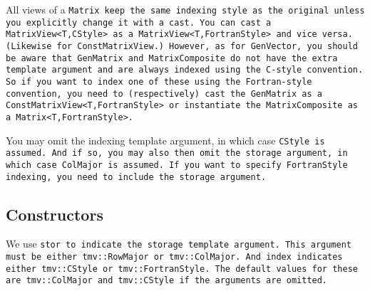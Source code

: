 All views of a \tt{Matrix} keep the same indexing style as the original unless you
explicitly change it with a cast.  You can cast a \tt{MatrixView<T,CStyle>}
as a \tt{MatrixView<T,FortranStyle>} and vice versa.  (Likewise for 
\tt{ConstMatrixView}.)  However, as for \tt{GenVector}, you should be
aware that \tt{GenMatrix}
and \tt{MatrixComposite} do not have the extra template argument and are always
indexed using the C-style convention.  So if you want to index one of these 
using the Fortran-style convention, you need to (respectively) cast the 
\tt{GenMatrix} as a \tt{ConstMatrixView<T,FortranStyle>} or instantiate the
\tt{MatrixComposite} as a \tt{Matrix<T,FortranStyle>}.

You may omit the indexing template argument, in which case \tt{CStyle} is assumed.
And if so, you may also then omit the storage argument, in which case \tt{ColMajor}
is assumed.  If you want to specify \tt{FortranStyle} indexing, you need
to include the storage argument.

\subsection{Constructors}
\label{Matrix_Constructors}

We use \tt{stor} to indicate the storage template argument. 
This argument must be either 
\tt{tmv::RowMajor} or \tt{tmv::ColMajor}.  And \tt{index} indicates either 
\tt{tmv::CStyle} or \tt{tmv::FortranStyle}.  The default values for these
are \tt{tmv::ColMajor} and \tt{tmv::CStyle} if the arguments are omitted.

